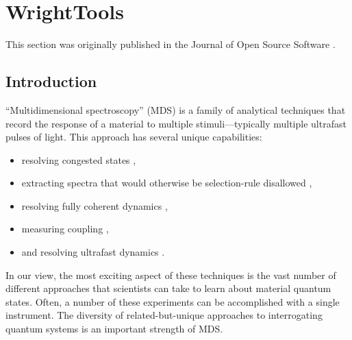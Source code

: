 



\clearpage

\section{WrightTools}  %

This section was originally published in the Journal of Open Source Software \cite{ThompsonBlaiseJonathan2019a}.

\hypertarget{introduction}{%
\subsection{Introduction}\label{introduction}}

``Multidimensional spectroscopy'' (MDS) is a family of analytical
techniques that record the response of a material to multiple
stimuli---typically multiple ultrafast pulses of light. This approach
has several unique capabilities:

\begin{itemize}
\item
	resolving congested states \cite{ZhaoWei1999b}\cite{DonaldsonPaulMurray2008a},
\item
  extracting spectra that would otherwise be selection-rule disallowed
		\cite{BoyleErinSelene2013b}\cite{BoyleErinSelene2014a},
\item
  resolving fully coherent dynamics \cite{PakoulevAndreiV2009a},
\item
  measuring coupling \cite{WrightJohnCurtis2011a},
\item
	and resolving ultrafast dynamics \cite{SmallwoodChristopherL2018a}\cite{CzechKyleJonathan2015a}.
\end{itemize}

In our view, the most exciting aspect of these techniques is the vast
number of different approaches that scientists can take to learn about
material quantum states. Often, a number of these experiments can be
accomplished with a single instrument. The diversity of
related-but-unique approaches to interrogating quantum systems is an
important strength of MDS.

